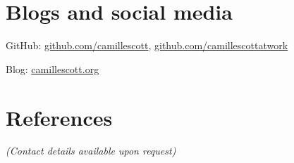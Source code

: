\documentclass[resmargin,12pt]{camille_resume}
\begin{document}
\begin{resume}
\begin{list1}
\end{list1}


\section{\mysidestyle Blogs and social media}

GitHub: \href{https://github.com/camillescott}{github.com/camillescott}, \href{https://github.com/camillescottatwork}{github.com/camillescottatwork}

Blog: \href{http://camillescott.org}{camillescott.org}  

\section{\mysidestyle References}

{\em (Contact details available upon request)}

\end{resume}
\end{document}

